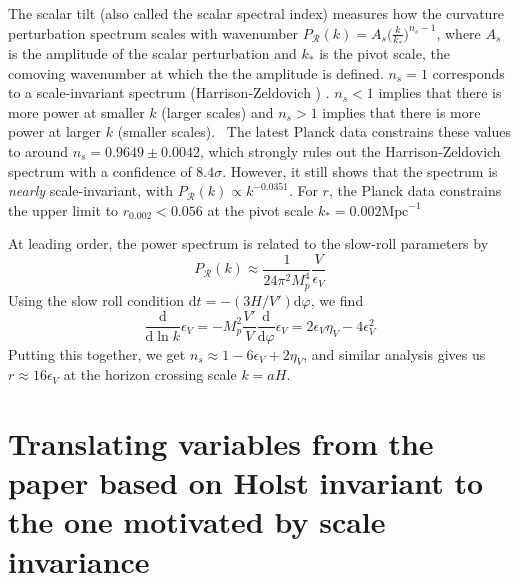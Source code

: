 \documentclass[aps,prd,reprint,preprintnumbers,showpacs,floatfix,nofootinbib,superscript address]{revtex4-2}
\newcommand{\wb}[1]{{\color[RGB]{255,0,0}{\textbf{\textit{[WB: #1]}}}}}
\begin{document}
The scalar tilt (also called the scalar spectral index) measures how the curvature perturbation spectrum scales with wavenumber $P_\mathcal{R}(k) = A_s\big(\frac{k}{k_*}\big)^{n_s-1}$, where $A_s$ is the amplitude of the scalar perturbation and $k_*$ is the pivot scale, the comoving wavenumber at which the the amplitude is defined. $n_s = 1$ corresponds to a scale-invariant spectrum (Harrison‑Zeldovich \cite{harrison_fluctuations_1970, zeldovich_hypothesis_1972, peebles_primeval_1970})
. $n_s < 1$ implies that there is more power at smaller $k$ (larger scales) and $n_s > 1$ implies that there is more power at larger $k$ (smaller scales). 
\
The latest Planck data \cite{collaboration_planck_2020} constrains these values to around $n_s = 0.9649 \pm 0.0042$, which strongly rules out the Harrison‑Zeldovich spectrum with a confidence of $8.4\sigma$. However, it still shows that the spectrum is \textit{nearly} scale-invariant, with $P_\mathcal{R}(k) \propto k^{-0.0351}$. For $r$, the Planck data constrains the upper limit to $r_{0.002} < 0.056$ at the pivot scale $k_* =0.002 \text{Mpc}^{-1}$

At leading order, the power spectrum is related to the slow-roll parameters by \cite{liddle_cosmological_2000}
\begin{equation}
    P_\mathcal{R}(k) \approx \frac{1}{24\pi^2 M_p^4} \frac{V}{\epsilon_V}
\end{equation}
Using the slow roll condition $\text{d}t = -(3H/V') \text{d}\varphi$, we find
\begin{equation}
    \frac{\text{d}}{\text{d} \ln k} \epsilon_V = -M_p^2 \frac{V'}{V}\frac{\text{d}}{\text{d}\varphi}\epsilon_V = 2\epsilon_V\eta_V - 4\epsilon_V^2
\end{equation}
Putting this together, we get $n_s \approx 1 -6\epsilon_V +2\eta_V$, and similar analysis \cite{baumann2012tasilecturesinflation} gives us $r \approx 16 \epsilon_V$ at the horizon crossing scale $k = aH$.


\section{Translating variables from the paper based on Holst invariant to the one motivated by scale invariance} \label{Translating variables from the paper based on Holst invariant to the one motivated by scale invariance}
\end{document}
